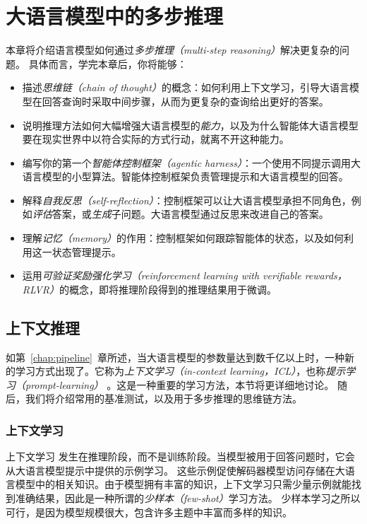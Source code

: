 \chapter{大语言模型中的多步推理}\label{chap:reasoning}

\begin{learningbox}
本章将介绍语言模型如何通过{\em 多步推理（multi-step reasoning）}解决更复杂的问题。
具体而言，学完本章后，你将能够：
\begin{itemize}[leftmargin=*, nosep]
    \item 描述{\em 思维链（chain of thought）}的概念：如何利用上下文学习，引导大语言模型在回答查询时采取中间步骤，从而为更复杂的查询给出更好的答案。
    \item 说明推理方法如何大幅增强大语言模型的{\em 能力}，以及为什么智能体大语言模型要在现实世界中以符合实际的方式行动，就离不开这种能力。
    \item 编写你的第一个{\em 智能体控制框架（agentic harness）}：一个使用不同提示调用大语言模型的小型算法。智能体控制框架负责管理提示和大语言模型的回答。
    \item 解释{\em 自我反思（self-reflection）}：控制框架可以让大语言模型承担不同角色，例如{\em 评估}答案，或{\em 生成}子问题。大语言模型通过反思来改进自己的答案。
    \item 理解{\em 记忆（memory）}的作用：控制框架如何跟踪智能体的状态，以及如何利用这一状态管理提示。
    \item 运用{\em 可验证奖励强化学习（reinforcement learning with verifiable rewards，RLVR）}的概念，即将推理阶段得到的推理结果用于微调。
\end{itemize}
\end{learningbox}

\section{上下文推理}\label{sec:reasoning}
如第~\ref{chap:pipeline}~章所述，当大语言模型的参数量达到数千亿以上时，一种新的学习方式出现了。它称为{\em 上下文学习（in-context learning，ICL）}，也称{\em 提示学习（prompt-learning）} \citep{brown2020language}。这是一种重要的学习方法，本节将更详细地讨论。
随后，我们将介绍常用的基准测试，以及用于多步推理的思维链方法。

\subsection{上下文学习}
上下文学习 \citep{dong2022survey} 发生在推理阶段，而不是训练阶段。当模型被用于回答问题时，它会从大语言模型提示中提供的示例学习。
这些示例促使解码器模型访问存储在大语言模型中的相关知识。由于模型拥有丰富的知识，上下文学习只需少量示例就能找到准确结果，因此是一种所谓的{\em 少样本（few-shot）}学习方法。
少样本学习之所以可行，是因为模型规模很大，包含许多主题中丰富而多样的知识。


